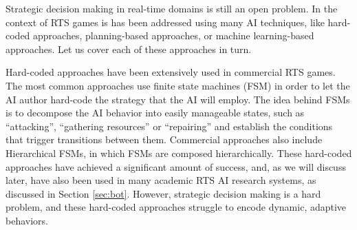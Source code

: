 \documentclass[journal]{IEEEtran}
\begin{document}
Strategic decision making in real-time domains is still an open problem. In the context of RTS games is has been addressed using many AI techniques, like hard-coded approaches, planning-based approaches, or machine learning-based approaches. Let us cover each of these approaches in turn.

Hard-coded approaches have been extensively used in commercial RTS games. The most common approaches use finite state machines (FSM) \cite{FSM_AIGameProgWisdom2003} in order to let the AI author hard-code the strategy that the AI will employ. The idea behind FSMs is to decompose the AI behavior into easily manageable states, such as ``attacking'', ``gathering resources'' or ``repairing'' and establish the conditions that trigger transitions between them. Commercial approaches also include Hierarchical FSMs, in which FSMs are composed hierarchically. These hard-coded approaches have achieved a significant amount of success, and, as we will discuss later, have also been used in many academic RTS AI research systems, as discussed in Section \ref{sec:bot}. However, strategic decision making is a hard problem, and these hard-coded approaches struggle to encode dynamic, adaptive behaviors. 

\end{document}

